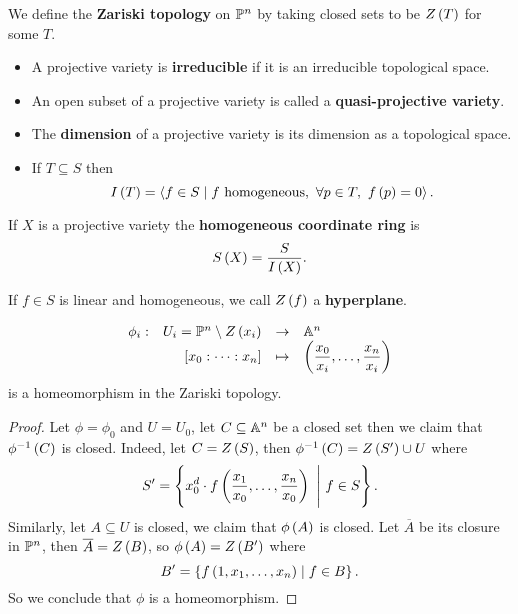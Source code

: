 \begin{definition}
We define the \textbf{Zariski topology} on $ \P^n $ by taking closed sets to be $ Z\rb{T} $ for some $ T $.
\end{definition}

\begin{definition}
\hfill
\begin{itemize}
\item A projective variety is \textbf{irreducible} if it is an irreducible topological space.
\item An open subset of a projective variety is called a \textbf{quasi-projective variety}.
\item The \textbf{dimension} of a projective variety is its dimension as a topological space.
\item If $ T \subseteq S $ then
$$ I\rb{T} = \ab{f \in S \mid f \ \text{homogeneous}, \ \forall p \in T, \ f\rb{p} = 0}. $$
\end{itemize}
\end{definition}

\begin{definition}
If $ X $ is a projective variety the \textbf{homogeneous coordinate ring} is
$$ S\rb{X} = \dfrac{S}{I\rb{X}}. $$
\end{definition}

\begin{definition}
If $ f \in S $ is linear and homogeneous, we call $ Z\rb{f} $ a \textbf{hyperplane}.
\end{definition}


\begin{proposition}
$$ \function[\phi_i]{U_i = \P^n \setminus Z\rb{x_i}}{\A^n}{\sb{x_0 : \dots : x_n}}{\rb{\dfrac{x_0}{x_i}, \dots, \dfrac{x_n}{x_i}}} $$
is a homeomorphism in the Zariski topology.
\end{proposition}

\begin{proof}
Let $ \phi = \phi_0 $ and $ U = U_0 $, let $ C \subseteq \A^n $ be a closed set then we claim that $ \phi^{-1}\rb{C} $ is closed. Indeed, let $ C = Z\rb{S} $, then $ \phi^{-1}\rb{C} = Z\rb{S'} \cup U $ where
$$ S' = \cb{x_0^d \cdot f\rb{\dfrac{x_1}{x_0}, \dots, \dfrac{x_n}{x_0}} \ \Bigg| \ f \in S}. $$
Similarly, let $ A \subseteq U $ is closed, we claim that $ \phi\rb{A} $ is closed. Let $ \overline{A} $ be its closure in $ \P^n $, then $ \overline{A} = Z\rb{B} $, so $ \phi\rb{A} = Z\rb{B'} $ where
$$ B' = \cb{f\rb{1, x_1, \dots, x_n} \mid f \in B}. $$
So we conclude that $ \phi $ is a homeomorphism.
\end{proof}

